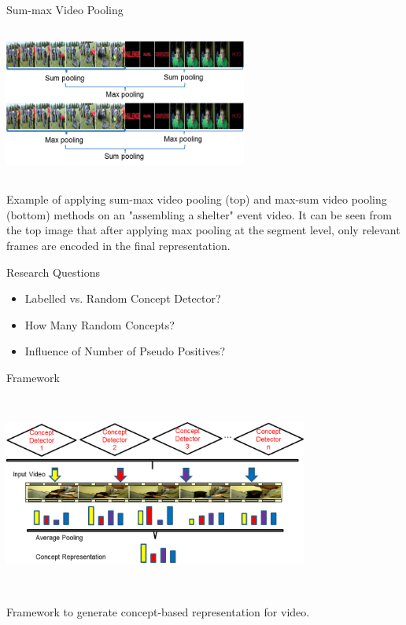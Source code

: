 \documentclass{beamer}
\begin{document}
\begin{frame}[t]{Sum-max Video Pooling}
\begin{center}
\includegraphics[width=8cm,height=5cm]{images/summax_maxsum.png}
\end{center}
Example of applying sum-max video pooling (top) and max-sum video pooling (bottom) methods on an "assembling a shelter" event video. It can be seen from the top image that after applying max pooling at the segment level, only relevant frames are encoded in the final representation.
\end{frame}



\begin{frame}[t]{Research Questions}

\begin{itemize}
\item Labelled vs. Random Concept Detector?
\item How Many Random Concepts?
\item Influence of Number of Pseudo Positives?
\end{itemize}

\end{frame}


\begin{frame}[t]{Framework}
\begin{center}
\includegraphics[width=10cm,height=6.5cm]{images/framework_representation.png}
\end{center}

Framework to generate concept-based representation for video.

\end{frame}
\end{document}
